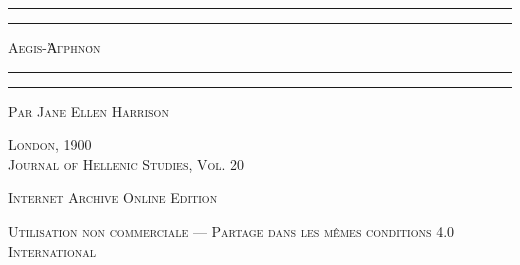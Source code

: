 \documentclass[a4paper, 11pt, oneside, polutonikogreek, french]{article}
\begin{document}
\Fontauri
\renewcommand\thefootnote{\Fontauri{\arabic{footnote}}}
\let\oldfootnote\footnote
    \renewcommand{\footnote}[1]{\oldfootnote{\Fontauri\large#1}}
\begin{titlepage} %
	\centering %

	
	\rule{\textwidth}{1.6pt}\vspace*{-\baselineskip}\vspace*{2pt} %
	\rule{\textwidth}{0.4pt} %
	
	\vspace{1\baselineskip} %
	
	{\scshape \LARGE Aegis-Ἀγρηνόν}
	
	\vspace{1\baselineskip} %

	\rule{\textwidth}{0.4pt}\vspace*{-\baselineskip}\vspace{3.2pt} %
	\rule{\textwidth}{1.6pt} %
	
	\vspace{1\baselineskip} %
	

 	\vspace*{1\baselineskip} %

	{\scshape \Large Par Jane Ellen Harrison} %

 	\vspace*{1\baselineskip} %

        \vspace*{\fill}

	\vspace{1\baselineskip}

	{\scshape London, 1900 \\Journal of Hellenic Studies, Vol. 20}
		
	\vspace{0.5\baselineskip} %

        \scshape Internet Archive Online Edition%
	
	{\scshape\small Utilisation non commerciale --- Partage dans les mêmes conditions 4.0 International} %
\end{titlepage}
\setlength{\parskip}{1mm plus1mm minus1mm}
\clearpage
\pagestyle{fancy}
\fancyhf{}
\cfoot{\Fontauri{\thepage}}
\Large
\end{document}
